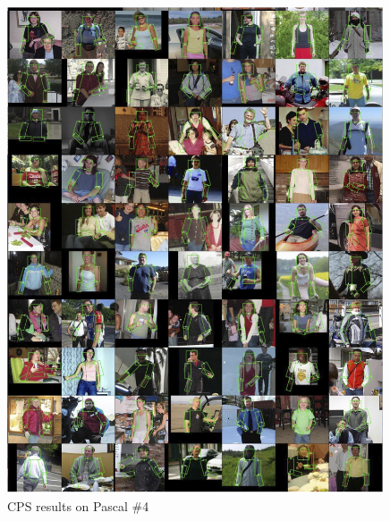 \begin{figure}[tb]
\begin{center}
\includegraphics[width=0.99\textwidth]{figs/pascal-cps-4.jpg}
\caption[CPS results on Pascal \#4]{CPS results on Pascal \#4}
\label{fig:pascal-cps4}
\end{center}
\end{figure}

